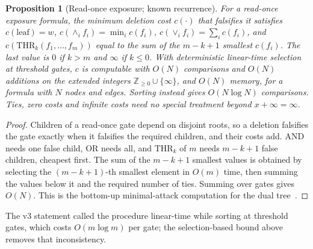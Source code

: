 \documentclass[pdflatex,sn-mathphys-num]{sn-jnl}
\theoremstyle{plain}
\newtheorem{proposition}[theorem]{Proposition}
\theoremstyle{definition}
\begin{document}
\begin{proposition}[Read-once exposure; known recurrence]\label{prop:readonce}
For a read-once exposure formula, the minimum deletion cost $c(\cdot)$ that falsifies it satisfies $c(\text{leaf})=w$, $c(\wedge_i f_i)=\min_i c(f_i)$, $c(\vee_i f_i)=\sum_i c(f_i)$, and $c(\mathrm{THR}_k(f_1,\dots,f_m))$ equal to the sum of the $m-k+1$ smallest $c(f_i)$. The last value is $0$ if $k>m$ and $\infty$ if $k\le0$. With deterministic linear-time selection~\cite{blum1973} at threshold gates, $c$ is computable with $O(N)$ comparisons and $O(N)$ additions on the extended integers $\mathbb{Z}_{\ge0}\cup\{\infty\}$, and $O(N)$ memory, for a formula with $N$ nodes and edges. Sorting instead gives $O(N\log N)$ comparisons. Ties, zero costs and infinite costs need no special treatment beyond $x+\infty=\infty$.
\end{proposition}
\begin{proof}
Children of a read-once gate depend on disjoint roots, so a deletion falsifies the gate exactly when it falsifies the required children, and their costs add. AND needs one false child, OR needs all, and $\mathrm{THR}_k$ of $m$ needs $m-k+1$ false children, cheapest first. The sum of the $m-k+1$ smallest values is obtained by selecting the $(m-k+1)$-th smallest element in $O(m)$ time, then summing the values below it and the required number of ties. Summing over gates gives $O(N)$. This is the bottom-up minimal-attack computation for the dual tree~\cite{mauw2005,lopuhaa2022}.
\end{proof}

The v3 statement called the procedure linear-time while sorting at threshold gates, which costs $O(m\log m)$ per gate; the selection-based bound above removes that inconsistency.
\end{document}
